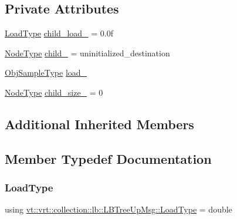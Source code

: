 \subsection*{Private Attributes}
\begin{DoxyCompactItemize}
\item 
\hyperlink{structvt_1_1vrt_1_1collection_1_1lb_1_1_l_b_tree_up_msg_a94e88fdd5142e26330a7feb8769de1bb}{Load\+Type} \hyperlink{structvt_1_1vrt_1_1collection_1_1lb_1_1_l_b_tree_up_msg_a8cf642de573d3ee48b854d1fbb3a5263}{child\+\_\+load\+\_\+} = 0.\+0f
\item 
\hyperlink{namespacevt_a866da9d0efc19c0a1ce79e9e492f47e2}{Node\+Type} \hyperlink{structvt_1_1vrt_1_1collection_1_1lb_1_1_l_b_tree_up_msg_ab369301f3bdf74cd6fbf5e5a5c885ce6}{child\+\_\+} = uninitialized\+\_\+destination
\item 
\hyperlink{structvt_1_1vrt_1_1collection_1_1lb_1_1_hier_l_b_types_a597a60d517207b90e8c7984eac434e8f}{Obj\+Sample\+Type} \hyperlink{structvt_1_1vrt_1_1collection_1_1lb_1_1_l_b_tree_up_msg_a9ed67bba04ee9261cb5d4a929170e28c}{load\+\_\+}
\item 
\hyperlink{namespacevt_a866da9d0efc19c0a1ce79e9e492f47e2}{Node\+Type} \hyperlink{structvt_1_1vrt_1_1collection_1_1lb_1_1_l_b_tree_up_msg_a3cf0b8cbf9a3669179119b40c2c38663}{child\+\_\+size\+\_\+} = 0
\end{DoxyCompactItemize}
\subsection*{Additional Inherited Members}


\subsection{Member Typedef Documentation}
\mbox{\label{structvt_1_1vrt_1_1collection_1_1lb_1_1_l_b_tree_up_msg_a94e88fdd5142e26330a7feb8769de1bb}} 
\subsubsection{\texorpdfstring{Load\+Type}{LoadType}}
{\footnotesize\ttfamily using \hyperlink{structvt_1_1vrt_1_1collection_1_1lb_1_1_l_b_tree_up_msg_a94e88fdd5142e26330a7feb8769de1bb}{vt\+::vrt\+::collection\+::lb\+::\+L\+B\+Tree\+Up\+Msg\+::\+Load\+Type} =  double}

